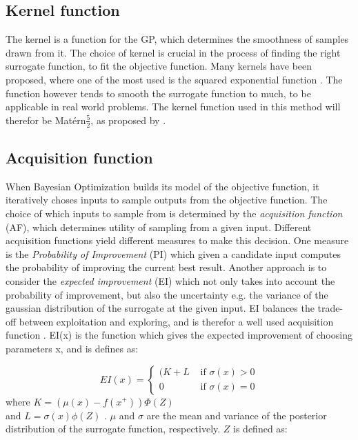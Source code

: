 \subsection{Kernel function}
The kernel is a function for the GP, which determines the smoothness of samples drawn from it. The choice of kernel is crucial in the process of finding the right surrogate function, to fit the objective function. Many kernels have been proposed, where one of the most used is the squared exponential function \citet{brochu2010tutorial}. The function however tends to smooth the surrogate function to much, to be applicable in real world problems. The kernel function used in this method will therefor be Matérn$\frac{5}{2}$, as proposed by \citet{snoek2012practical}.

\subsection{Acquisition function}
When Bayesian Optimization builds its model of the objective function, it iteratively choses inputs to sample outputs from the objective function. The choice of which inputs to sample from is determined by the \emph{acquisition function} (AF), which determines utility of sampling from a given input. Different acquisition functions yield different measures to make this decision. One measure is the \emph{Probability of Improvement} (PI) which given a candidate input computes the probability of improving the current best result.  Another approach is to consider the \emph{expected improvement} (EI) which not only takes into account the probability of improvement, but also the uncertainty e.g. the variance of the gaussian distribution of the surrogate at the given input.
EI balances the trade-off between exploitation and exploring, and is therefor a well used acquisition function \citet{brochu2010tutorial}. EI(x) is the function which gives the expected improvement of choosing parameters x, and is defines as:

\begin{equation}
\label{eq:expected-improvement}
EI(x) =
\begin{cases}
   (K + L & \text{ if } \sigma(x) > 0\\
   0 	  & \text{ if } \sigma(x) = 0
\end{cases}
\end{equation}
where $K = (\mu(x) - f(x^+))\Phi(Z)$ \\and $L = \sigma(x)\phi(Z)$ .
$\mu$ and $\sigma$ are the mean and variance of the posterior distribution of the surrogate function, respectively. $Z$ is defined as:

